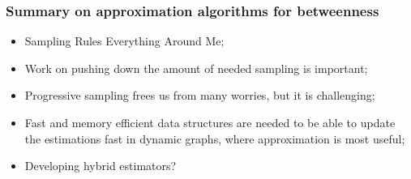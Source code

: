 \begin{frame}
  \frametitle{Summary on approximation algorithms for betweenness}
  \begin{itemize}
    \item Sampling Rules Everything Around Me;
      \pause
    \item Work on pushing down the amount of needed sampling is important;
      \pause
    \item Progressive sampling frees us from many worries, but it is
      challenging;
      \pause
    \item  Fast and memory efficient data structures are needed to be able to
      update the estimations fast in dynamic graphs, where approximation is
      most useful;
      \pause
    \item Developing hybrid estimators?
  \end{itemize}
\end{frame}
